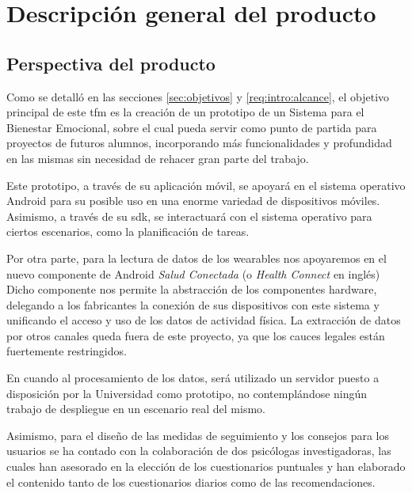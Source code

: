 \section{Descripción general del producto}
    \label{req:descripcion}

    \subsection{Perspectiva del producto}
        \label{req:descripcion:perspectiva}

        Como se detalló en las secciones \ref{sec:objetivos} y 
        \ref{req:intro:alcance}, el objetivo principal de este \gls{tfm} es la creación de un prototipo de un Sistema para el Bienestar Emocional, sobre el cual pueda servir como punto de partida para proyectos de futuros alumnos, incorporando más funcionalidades y profundidad en las mismas sin necesidad de rehacer gran parte del trabajo. 

        Este prototipo, a través de su aplicación móvil, se apoyará en el sistema operativo Android para su posible uso en una enorme variedad de dispositivos móviles. Asimismo, a través de su \gls{sdk}, se interactuará con el sistema operativo para ciertos escenarios, como la planificación de tareas.

        Por otra parte, para la lectura de datos de los \glspl{wearable} nos apoyaremos en el nuevo componente de Android \textit{Salud Conectada} (o \textit{Health Connect} en inglés) Dicho componente nos permite la abstracción de los componentes hardware, delegando a los fabricantes la conexión de sus dispositivos con este sistema y unificando el acceso y uso de los datos de actividad física. La extracción de datos por otros canales queda fuera de este proyecto, ya que los cauces legales están fuertemente restringidos. 

        En cuando al procesamiento de los datos, será utilizado un servidor puesto a disposición por la Universidad como prototipo, no contemplándose ningún trabajo de despliegue en un escenario real del mismo.

        Asimismo, para el diseño de las medidas de seguimiento y los consejos para los usuarios se ha contado con la colaboración de dos psicólogas investigadoras, las cuales han asesorado en la elección de los cuestionarios puntuales y han elaborado el contenido tanto de los cuestionarios diarios como de las recomendaciones. 

        
